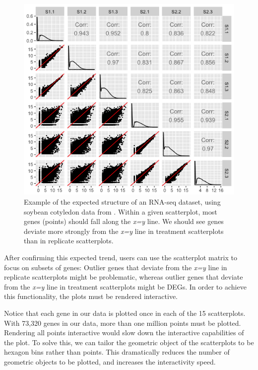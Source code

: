 \documentclass[11pt,a4paper,oldfontcommands,openany]{memoir}
\numberwithin{equation}{section} %
\begin{document}
\begin{figure}[!tpb]
\begin{framed}
\centerline{\includegraphics[width=\columnwidth]{MakeFigures/sbCNSM.jpg}}
\end{framed}
\caption{Example of the expected structure of an RNA-seq dataset, using soybean cotyledon data from \cite{Brown}. Within a given scatterplot, most genes (points) should fall along the \textit{x=y} line. We should see genes deviate more strongly from the \textit{x=y} line in treatment scatterplots than in replicate scatterplots. 
\label{sbCNSM}}
\end{figure}

After confirming this expected trend, users can use the scatterplot matrix to focus on subsets of genes: Outlier genes that deviate from the \textit{x=y} line in replicate scatterplots might be problematic, whereas outlier genes that deviate from the \textit{x=y} line in treatment scatterplots might be DEGs. In order to achieve this functionality, the plots must be rendered interactive.

Notice that each gene in our data is plotted once in each of the 15 scatterplots. With 73,320 genes in our data, more than one million points must be plotted. Rendering all points interactive would slow down the interactive capabilities of the plot. To solve this, we can tailor the geometric object of the scatterplots to be hexagon bins rather than points. This dramatically reduces the number of geometric objects to be plotted, and increases the interactivity speed.
\end{document}
